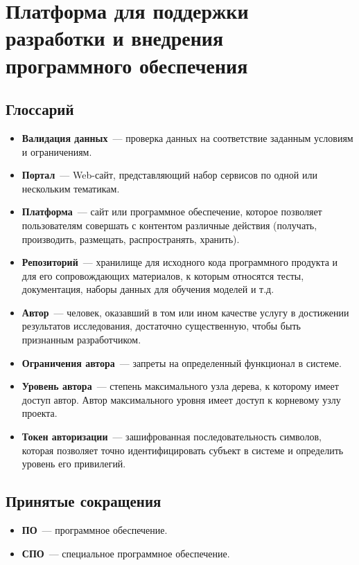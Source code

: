 \documentclass{bmstu}
\begin{document}
  \chapter{Платформа для поддержки разработки и внедрения программного
  обеспечения}

  \section*{Глоссарий}

  \begin{itemize}
    \item[] \textbf{Валидация данных}~--- проверка данных на
      соответствие заданным условиям и ограничениям.
    \item[] \textbf{Портал}~--- Web-сайт, представляющий набор
      сервисов по одной или нескольким тематикам.
    \item[] \textbf{Платформа}~--- сайт или программное обеспечение,
      которое позволяет пользователям совершать с контентом различные
      действия (получать, производить, размещать, распространять,
      хранить).
    \item[] \textbf{Репозиторий}~--- хранилище для исходного кода
      программного продукта и для его сопровождающих материалов, к
      которым относятся тесты, документация, наборы данных для
      обучения моделей и т.д.
    \item[] \textbf{Автор}~--- человек, оказавший в том или ином
      качестве услугу в достижении результатов исследования,
      достаточно существенную, чтобы быть признанным разработчиком.
    \item[] \textbf{Ограничения автора}~--- запреты на определенный
      функционал в системе.
    \item[] \textbf{Уровень автора}~--- степень максимального узла
      дерева, к которому имеет доступ автор. Автор максимального
      уровня имеет доступ к корневому узлу проекта.
    \item[] \textbf{Токен авторизации}~--- зашифрованная
      последовательность символов, которая позволяет точно
      идентифицировать субъект в системе и определить уровень его
      привилегий.
  \end{itemize}

  \section*{Принятые сокращения}

  \begin{itemize}
    \item[] \textbf{ПО}~--- программное обеспечение.
    \item[] \textbf{СПО}~--- специальное программное обеспечение.
  \end{itemize}
\end{document}
